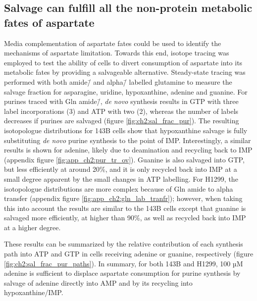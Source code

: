 \subsection{Salvage can fulfill all the non-protein metabolic fates of aspartate}
Media complementation of aspartate fates could be used to identify the mechanisms of aspartate limitation.
Towards this end, isotope tracing was employed to test the ability of cells to divert consumption of aspartate into its metabolic fates by providing a salvageable alternative.
Steady-state tracing was performed with both amide\=/\hNi{} and alpha\=/\hNi{} labelled glutamine to measure the salvage fraction for asparagine, uridine, hypoxanthine, adenine and guanine.
For purines traced with Gln amide\=/\hNi{}, \textit{de novo} synthesis results in GTP with three label incorporations (\hNi{}3) and ATP with two (\hNi{}2), whereas the number of labels decreases if purines are salvaged (figure \ref{fig:ch2:sal_frac_pur}).
The resulting isotopologue distributions for 143B cells show that hypoxanthine salvage is fully substituting \textit{de novo} purine synthesis to the point of IMP.
Interestingly, a similar results is shown for adenine, likely due to deamination and recycling back to IMP (appendix figure \ref{fig:app_ch2:pur_tr_ov}).
Guanine is also salvaged into GTP, but less efficiently at around 20\%, and it is only recycled back into IMP at a small degree apparent by the small changes in ATP labelling.
For H1299, the isotopologue distributions are more complex because of Gln amide to alpha \hNi{} transfer (appendix figure \ref{fig:app_ch2:gln_lab_tranfr}); however, when taking this into account the results are similar to the 143B cells except that guanine is salvaged more efficiently, at higher than 90\%, as well as recycled back into IMP at a higher degree.

These results can be summarized by the relative contribution of each synthesis path into ATP and GTP in cells receiving adenine or guanine, respectively (figure \ref{fig:ch2:sal_frac_pur_paths}).
In summary, for both 143B and H1299, 100 µM adenine is sufficient to displace aspartate consumption for purine synthesis by salvage of adenine directly into AMP and by its recycling into hypoxanthine/IMP.

